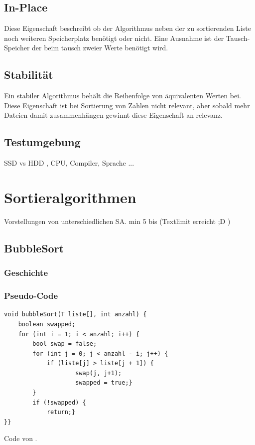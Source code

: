 \documentclass{article}
\begin{document}
\subsection{In-Place}
Diese Eigenschaft beschreibt ob der Algorithmus neben der zu sortierenden Liste noch weiteren Speicherplatz benötigt oder nicht. Eine Ausnahme ist der Tausch-Speicher der beim tausch zweier Werte benötigt wird. \cite{in-place}
\subsection{Stabilität}
Ein stabiler Algorithmus behält die Reihenfolge von äquivalenten Werten bei. Diese Eigenschaft ist bei Sortierung von Zahlen nicht relevant, aber sobald mehr Dateien damit zusammenhängen gewinnt diese Eigenschaft an relevanz. \cite{stability}
\subsection{Testumgebung}
SSD vs HDD , CPU, Compiler, Sprache ...


\section{Sortieralgorithmen}
Vorstellungen von unterschiedlichen SA. min 5 bis (Textlimit erreicht ;D  ) 

\subsection{BubbleSort}
\subsubsection{Geschichte}
\subsubsection{Pseudo-Code} \cite{bubbleSortCode}
\begin{lstlisting}
void bubbleSort(T liste[], int anzahl) {
    boolean swapped;
    for (int i = 1; i < anzahl; i++) {
        bool swap = false;
        for (int j = 0; j < anzahl - i; j++) { 
            if (liste[j] > liste[j + 1]) {
                	swap(j, j+1);
                	swapped = true;}
        }
        if (!swapped) {
            return;}
}}
\end{lstlisting} 
Code von \cite{bubbleSortCode}.
\end{document}
